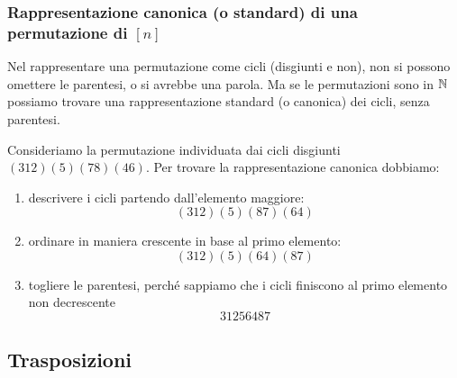 \subsubsection{Rappresentazione canonica (o standard) di una permutazione di $[n]$}

Nel rappresentare una permutazione come cicli (disgiunti e non), non si possono omettere le parentesi, o si avrebbe una parola. Ma se le permutazioni sono in $\mathbb{N}$ possiamo trovare una rappresentazione standard (o canonica) dei cicli, senza parentesi.

Consideriamo la permutazione individuata dai cicli disgiunti $(3 1 2) (5) (7 8) (4 6)$. Per trovare la rappresentazione canonica dobbiamo:
\begin{enumerate}
    \item descrivere i cicli partendo dall'elemento maggiore:
    \[
    (3 1 2) (5) (8 7) (6 4)
    \]
    \item ordinare in maniera crescente in base al primo elemento:
    \[
    (3 1 2) (5) (6 4) (8 7)
    \]
    \item togliere le parentesi, perch\'e sappiamo che i cicli finiscono al primo elemento non decrescente
    \[
    3 1 2 5 6 4 8 7
    \]
\end{enumerate}

\subsection{Trasposizioni}

